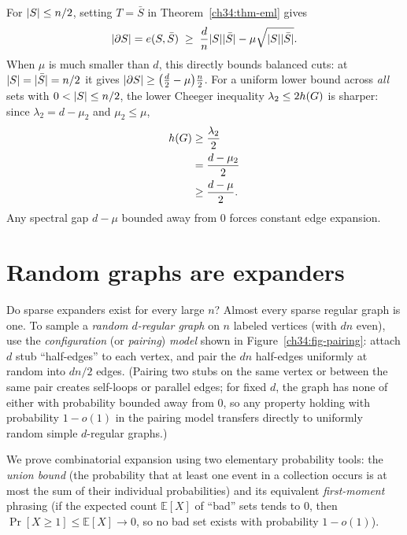 \begin{corollary}
\label{ch34:cor-eml-cut}
For $\lvert S\rvert\le n/2$, setting $T=\bar S$ in Theorem~\ref{ch34:thm-eml} gives
\[
  \lvert\partial S\rvert=e(S,\bar S)\;\ge\; \frac{d}{n}\lvert S\rvert\lvert\bar S\rvert-\mu\sqrt{\lvert S\rvert\lvert\bar S\rvert}.
\]
When $\mu$ is much smaller than $d$, this directly bounds balanced cuts: at $\lvert S\rvert=\lvert\bar S\rvert=n/2$ it gives $\lvert\partial S\rvert\ge \bigl(\tfrac{d}{2}-\mu\bigr)\tfrac{n}{2}$. For a uniform lower bound across \emph{all} sets with $0<\lvert S\rvert\le n/2$, the lower Cheeger inequality $\lambda_2\le 2h(G)$ is sharper: since $\lambda_2 = d-\mu_2$ and $\mu_2\le\mu$,
\begin{align*}
  h(G) &\ge \frac{\lambda_2}{2} \\
          &= \frac{d-\mu_2}{2} \\
          &\ge \frac{d-\mu}{2}.
\end{align*}
Any spectral gap $d-\mu$ bounded away from $0$ forces constant edge expansion.
\end{corollary}

\section{Random graphs are expanders}
\label{ch34:random}

Do sparse expanders exist for every large $n$? Almost every sparse regular graph is one. To sample a \emph{random $d$-regular graph} on $n$ labeled vertices (with $dn$ even), use the \emph{configuration} (or \emph{pairing}) \emph{model} shown in Figure~\ref{ch34:fig-pairing}: attach $d$ stub ``half-edges'' to each vertex, and pair the $dn$ half-edges uniformly at random into $dn/2$ edges. (Pairing two stubs on the same vertex or between the same pair creates self-loops or parallel edges; for fixed $d$, the graph has none of either with probability bounded away from $0$, so any property holding with probability $1-o(1)$ in the pairing model transfers directly to uniformly random simple $d$-regular graphs.)

We prove combinatorial expansion using two elementary probability tools: the \emph{union bound} (the probability that at least one event in a collection occurs is at most the sum of their individual probabilities) and its equivalent \emph{first-moment} phrasing (if the expected count $\mathbb{E}[X]$ of ``bad'' sets tends to $0$, then $\Pr[X\ge 1]\le\mathbb{E}[X]\to 0$, so no bad set exists with probability $1-o(1)$).

